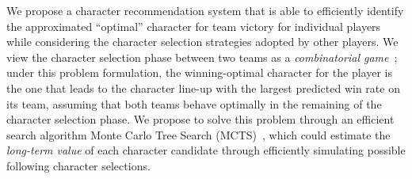 

We propose a character recommendation system that is able to efficiently identify the approximated ``optimal'' character for team victory for individual players while considering the character selection strategies adopted by other players. We view the character selection phase between two teams as a \textit{combinatorial game}~\cite{browne2012survey}; under this problem formulation, the winning-optimal character for the player is the one that leads to the character line-up with the largest predicted win rate on its team, assuming that both teams behave optimally in the remaining of the character selection phase. We propose to solve this problem through an efficient search algorithm Monte Carlo Tree Search (MCTS)~\cite{kocsis2006bandit}, which could estimate the \textit{long-term value} of each character candidate through efficiently simulating possible following character selections. 

